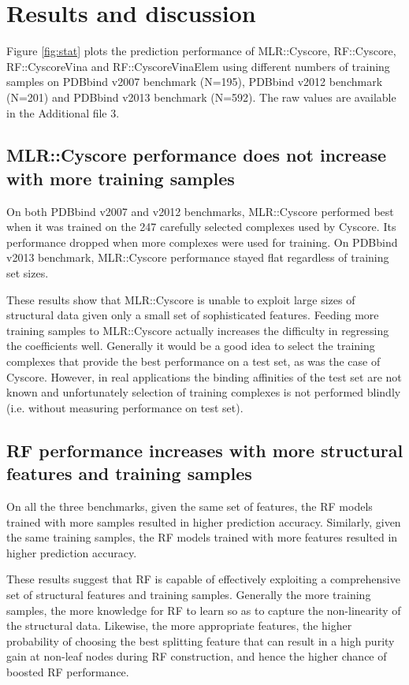 \documentclass[linenumbers]{bmcart}
\begin{document}
\section*{Results and discussion}

Figure \ref{fig:stat} plots the prediction performance of MLR::Cyscore, RF::Cyscore, RF::CyscoreVina and RF::CyscoreVinaElem using different numbers of training samples on PDBbind v2007 benchmark (N=195), PDBbind v2012 benchmark (N=201) and PDBbind v2013 benchmark (N=592). The raw values are available in the Additional file 3.

\subsection*{MLR::Cyscore performance does not increase with more training samples}

On both PDBbind v2007 and v2012 benchmarks, MLR::Cyscore performed best when it was trained on the 247 carefully selected complexes used by Cyscore. Its performance dropped when more complexes were used for training. On PDBbind v2013 benchmark, MLR::Cyscore performance stayed flat regardless of training set sizes.

These results show that MLR::Cyscore is unable to exploit large sizes of structural data given only a small set of sophisticated features. Feeding more training samples to MLR::Cyscore actually increases the difficulty in regressing the coefficients well. Generally it would be a good idea to select the training complexes that provide the best performance on a test set, as was the case of Cyscore. However, in real applications the binding affinities of the test set are not known and unfortunately selection of training complexes is not performed blindly (i.e. without measuring performance on test set).

\subsection*{RF performance increases with more structural features and training samples}

On all the three benchmarks, given the same set of features, the RF models trained with more samples resulted in higher prediction accuracy. Similarly, given the same training samples, the RF models trained with more features resulted in higher prediction accuracy.

These results suggest that RF is capable of effectively exploiting a comprehensive set of structural features and training samples. Generally the more training samples, the more knowledge for RF to learn so as to capture the non-linearity of the structural data. Likewise, the more appropriate features, the higher probability of choosing the best splitting feature that can result in a high purity gain at non-leaf nodes during RF construction, and hence the higher chance of boosted RF performance.
\end{document}
